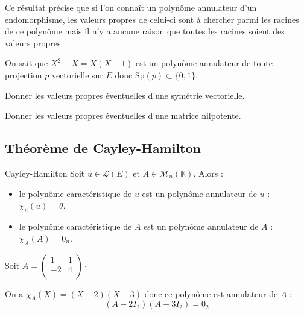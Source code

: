 \documentclass[french,11pt,twoside]{VcCours}
\begin{document}
  
 \begin{Remarque}[\alerte]{} Ce résultat précise que si l'on connaît un polynôme annulateur d'un endomorphisme, les valeurs propres de celui-ci sont à chercher parmi les racines de ce polynôme mais il n'y a aucune raison que toutes les racines soient des valeurs propres.
 \end{Remarque}
 
  
 \begin{Exemple}{} On sait que $X^2-X=X(X-1)$ est un polynôme annulateur de toute projection $p$ vectorielle sur $E$ donc $\textrm{Sp}(p) \subset \lbrace 0,1 \rbrace$. 
 \end{Exemple}
 
 \begin{ApplicationDirecte}{} Donner les valeurs propres éventuelles d'une symétrie vectorielle.
 \end{ApplicationDirecte}
 
 \begin{ApplicationDirecte}{} Donner les valeurs propres éventuelles d'une matrice nilpotente.
 \end{ApplicationDirecte}
 
 \subsection{Théorème de Cayley-Hamilton}
 
 \begin{Theoreme}{Cayley-Hamilton} Soit $u \in \mathcal{L}(E)$ et $A \in \mathcal{M}_n(\mathbb{K})$. Alors :
 \begin{itemize}
\item le polynôme caractéristique de $u$ est un polynôme annulateur de $u$ : $\chi_u(u)= \tilde{\theta}$.
\item le polynôme caractéristique de $A$ est un polynôme annulateur de $A$ : $\chi_A(A)= 0_n$.
\end{itemize}
 \end{Theoreme}
 
 
 \begin{Exemple}{} Soit $A = \begin{pmatrix}
 1 & 1 \\
 -2 & 4 \\
 \end{pmatrix} \cdot$
 
  
 On a $\chi_A(X) = (X-2)(X-3)$ donc ce polynôme est annulateur de $A$ : 
 $$ (A- 2I_2)(A-3 I_2) = 0_2 $$
 \end{Exemple}
 
\end{document}
